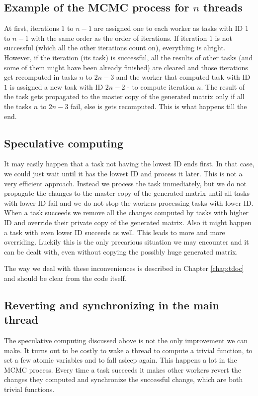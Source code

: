 \subsection{Example of the MCMC process for $n$ threads}
At first, iterations $1$ to $n-1$ are assigned one to each worker as tasks with ID $1$ to $n-1$ with the same order as the order of iterations. If iteration $1$ is not successful (which all the other iterations count on), everything is alright. However, if the iteration (its task) is successful, all the results of other tasks (and some of them might have been already finished) are cleared and those iterations get recomputed in tasks $n$ to $2n-3$ and the worker that computed task with ID $1$ is assigned a new task with ID $2n-2$ - to compute iteration $n$. The result of the task gets propagated to the master copy of the generated matrix only if all the tasks $n$ to $2n-3$ fail, else is gets recomputed. This is what happens till the end.

\subsection{Speculative computing}
It may easily happen that a task not having the lowest ID ends first. In that case, we could just wait until it has the lowest ID and process it later. This is not a very efficient approach. Instead we process the task immediately, but we do not propagate the changes to the master copy of the generated matrix until all tasks with lower ID fail and we do not stop the workers processing tasks with lower ID. When a task succeeds we remove all the changes computed by tasks with higher ID and override their private copy of the generated matrix. Also it might happen a task with even lower ID succeeds as well. This leads to more and more overriding. Luckily this is the only precarious situation we may encounter and it can be dealt with, even without copying the possibly huge generated matrix.

The way we deal with these inconveniences is described in Chapter \ref{chap:tdoc} and should be clear from the code itself.

\subsection{Reverting and synchronizing in the main thread}
The speculative computing discussed above is not the only improvement
we can make. It turns out to be costly to wake a thread to compute a trivial function, to set a few atomic variables and to fall asleep again. This happens a lot in the MCMC process. Every time a task succeeds it makes other workers revert the changes they computed and synchronize the successful change, which are both trivial functions.

